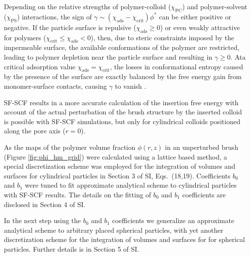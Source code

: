 \documentclass[12pt, a4paper]{article}
\begin{document}
Depending on the relative strengths of polymer-colloid ($\chi_{\text{PC}}$) and polymer-solvent ($\chi_{\text{PS}}$) interactions, the sign of $\gamma \sim (\chi_{\text{ads}} - \chi_{\text{crit}}) \phi^{\ast}$ can be either positive or negative.
If the particle surface is repulsive ($\chi_{\text{ads}} \geq 0$) or even weakly attractive for polymers ($\chi_{\text{crit}} \leq \chi_{\text{ads}} < 0$), then, due to steric constraints imposed by the impermeable surface, the available conformations of the polymer are restricted, leading to polymer depletion near the particle surface and resulting in $\gamma \geq 0$.
Ata critical adsorption value $\chi_{\text{ads}} = \chi_{\text{crit}}$, the losses in conformational entropy caused by the presence of the surface are exactly balanced by the free energy gain from monomer-surface contacts, causing $\gamma$ to vanish \cite{Fleer1993,Birshtein1979,Birshtein1983,Eisenriegler1982}.

SF-SCF results in a more accurate calculation of the insertion free energy with account of the actual perturbation of the brush structure by the inserted colloid is possible with SF-SCF simulations, but only for cylindrical colloids positioned along the pore axis ($r=0$).

As the maps of the polymer volume fraction $\phi(r,z)$ in an unperturbed brush (Figure \ref{fig:phi_hm_grid}) were calculated using a lattice based method, a special discretization scheme was employed for the integration of volumes and surfaces for cylindrical particles in
Section 3 of SI, Eqs.~(18,19).
Coefficients $b_0$ and $b_1$ were tuned to fit approximate analytical scheme to cylindrical particles with SF-SCF results.
The details on the fitting of $b_0$ and $b_1$ coefficients are disclosed in Section 4 of SI.

In the next step using the $b_0$ and $b_1$ coefficients we generalize an approximate analytical scheme to arbitrary placed spherical particles, with yet another discretization scheme for the integration of volumes and surfaces for for spherical particles.
Further details is in Section 5 of SI.
\end{document}

